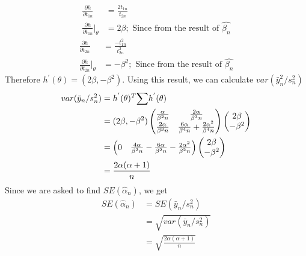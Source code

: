 \documentclass[11pt]{article}
\begin{document}
\begin{equation}
  \nonumber
  \begin{aligned}
    \frac{\partial h}{\partial t_{1n}} &= \frac{2t_{1n}}{t_{2n}}\\
    \frac{\partial h}{\partial t_{1n}} \bigg\rvert_{\theta}  & = 2\beta; \text{ Since from the result of } \hat{\beta_{n}}
  \end{aligned}
\end{equation}
\begin{equation}
  \nonumber
  \begin{aligned}
    \frac{\partial h}{\partial t_{2n}} &= \frac{-t_{1n}^{2}}{t_{2n}^{2}}\\
    \frac{\partial h}{\partial t_{2n}} \bigg\rvert_{\theta}  & = -\beta^{2}; \text{ Since from the result of } \hat{\beta_{n}}
  \end{aligned}
\end{equation}
Therefore $h^{'}(\theta) = (2\beta, -\beta^{2})$. Using this result, we can calculate $var(\bar{y}_{n}^{2}/s_{n}^{2})$
\begin{equation}
  \nonumber
  \begin{aligned}
      var(\bar{y}_{n}/s_{n}^{2}) & =  h^{'}(\mathbf{\theta})^{T}\mathbf{\text{$ \sum$}}h^{'}(\mathbf{\theta})\\
      & = (2\beta, -\beta^{2}) \begin{pmatrix}
        \frac{\alpha}{\beta^{2}n} & \frac{2\alpha}{\beta^{3}n}\\
        \frac{2\alpha}{\beta^{3}n} & \frac{6\alpha}{\beta^{4}n} + \frac{2\alpha^{2}}{\beta^{4}n}
    \end{pmatrix}
    \begin{pmatrix}
      2\beta\\
      -\beta^{2}
    \end{pmatrix}\\
    & = \begin{pmatrix}
      0 & \frac{4\alpha}{\beta^{2}n} - \frac{6\alpha}{\beta^{2}n} - \frac{2\alpha^{2}}{\beta^{2}n}
  \end{pmatrix}\begin{pmatrix}
    2\beta\\
    -\beta^{2}
\end{pmatrix}\\
& = \frac{2\alpha(\alpha + 1)}{n}
  \end{aligned}
\end{equation}
Since we are asked to find $SE(\hat{\alpha}_{n})$, we get
\begin{equation}
  \nonumber
  \begin{aligned}
    SE(\hat{\alpha}_{n}) & = SE(\bar{y}_{n}/s_{n}^{2})\\
    & = \sqrt{var(\bar{y}_{n}/s_{n}^{2})}\\
    & = \sqrt{\frac{2\alpha(\alpha + 1)}{n}}
  \end{aligned}
\end{equation}
\end{document}
